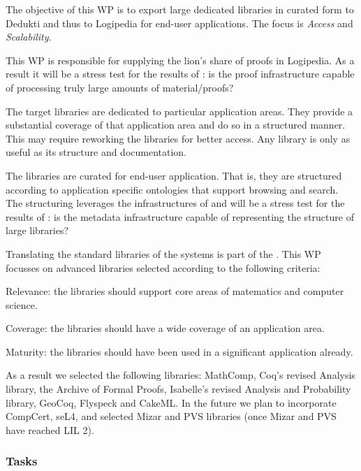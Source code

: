 The objective of this WP is to export large dedicated libraries in
curated form to Dedukti and thus to Logipedia for end-user applications.
The focus is \emph{Access} and \emph{Scalability}.
\begin{compactitem}
\item This WP is responsible for supplying the lion's share of proofs in
Logipedia.  As a result it will be a stress test for the
results of : is the proof infrastructure
capable of processing truly large amounts of material/proofs?

\item The target libraries are dedicated to particular application
areas. They provide a substantial coverage of that application area
and do so in a structured manner. This may require reworking the
libraries for better access. Any library is only as useful as its structure and documentation.

\item The libraries are curated for end-user application. That is, they
are structured according to application specific ontologies that
support browsing and search. The structuring leverages the
infrastructures of  and will be a
stress test for the results of : is the metadata
infrastructure capable of representing the structure of large
libraries?
\end{compactitem}
Translating the standard libraries of the systems is part of the .
This WP focusses on advanced libraries selected according to the following criteria:
\begin{compactitem}
\item Relevance: the libraries should support core areas of matematics and computer science.
\item Coverage: the libraries should have a wide coverage of an application area.
\item Maturity: the libraries should have been used in a significant application already.
\end{compactitem}
As a result we selected the following libraries: MathComp, Coq's revised
Analysis library, the Archive of Formal Proofs, Isabelle's revised Analysis and Probability library,
GeoCoq, Flyspeck and CakeML. In the future we plan to incorporate
CompCert, seL4, and selected Mizar and PVS libraries (once Mizar and
PVS have reached LIL 2).

\subsubsection*{Tasks}

